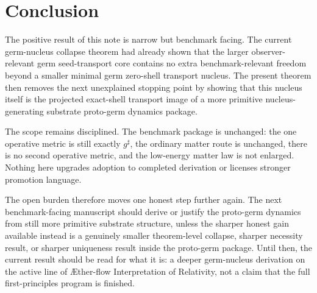 \documentclass[11pt]{article}
\newcommand{\Aflow}{\AE{}ther-flow}
\newcommand{\TheoryName}{\Aflow{} Interpretation of Relativity}
\newcommand{\CompletedMetric}{g^{\sharp}}
\begin{document}
\section{Conclusion}

The positive result of this note is narrow but benchmark facing. The current germ-nucleus collapse theorem had already shown that the larger observer-relevant germ seed-transport core contains no extra benchmark-relevant freedom beyond a smaller minimal germ zero-shell transport nucleus. The present theorem then removes the next unexplained stopping point by showing that this nucleus itself is the projected exact-shell transport image of a more primitive nucleus-generating substrate proto-germ dynamics package.

The scope remains disciplined. The benchmark package is unchanged: the one operative metric is still exactly \(\CompletedMetric\), the ordinary matter route is unchanged, there is no second operative metric, and the low-energy matter law is not enlarged. Nothing here upgrades adoption to completed derivation or licenses stronger promotion language.

The open burden therefore moves one honest step further again. The next benchmark-facing manuscript should derive or justify the proto-germ dynamics from still more primitive substrate structure, unless the sharper honest gain available instead is a genuinely smaller theorem-level collapse, sharper necessity result, or sharper uniqueness result inside the proto-germ package. Until then, the current result should be read for what it is: a deeper germ-nucleus derivation on the active line of \TheoryName{}, not a claim that the full first-principles program is finished.
\end{document}
